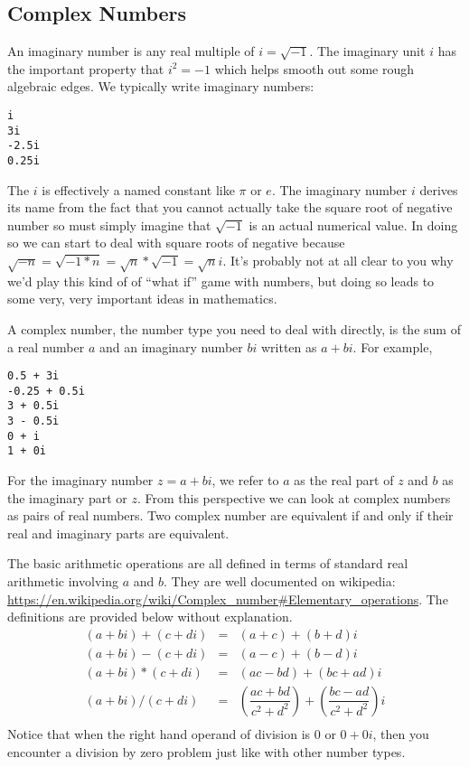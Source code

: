 \documentclass[10pt]{article}
\begin{document}
\subsection{Complex Numbers}

An imaginary number is any real multiple of $i = \sqrt{-1}$. The imaginary unit $i$ has the important property that $i^2 = -1$ which helps smooth out some rough algebraic edges. We typically write imaginary numbers: 
\begin{verbatim}
i
3i
-2.5i
0.25i
\end{verbatim}
The $i$ is effectively a named constant like $\pi$ or $e$. The imaginary number $i$ derives its name from the fact that you cannot actually take the square root of negative number so must simply imagine that $\sqrt{-1}$ is an actual numerical value. In doing so we can start to deal with square roots of negative because $\sqrt{-n} = \sqrt{-1*n} = \sqrt{n}*\sqrt{-1} = \sqrt{n}i$. It's probably not at all clear to you why we'd play this kind of of ``what if'' game with numbers, but doing so leads to some very, very important ideas in mathematics. 

A complex number, the number type you need to deal with directly, is the sum of a real number $a$ and an imaginary number $bi$ written as $a + bi$. For example,
\begin{verbatim}
0.5 + 3i
-0.25 + 0.5i
3 + 0.5i
3 - 0.5i
0 + i
1 + 0i
\end{verbatim}
For the imaginary number $z=a+bi$, we refer to $a$ as the real part of $z$ and $b$ as the imaginary part or $z$. From this perspective we can look at complex numbers as pairs of real numbers. Two complex number are equivalent if and only if their real and imaginary parts are equivalent.

The basic arithmetic operations are all defined in terms of standard real arithmetic involving $a$ and $b$. They are well documented on wikipedia: \url{https://en.wikipedia.org/wiki/Complex_number#Elementary_operations}. The definitions are provided below without explanation.
\begin{equation}
\begin{array}{rcl}
(a+bi)+(c+di) &=& (a+c)+(b+d)i \\ 
(a+bi)-(c+di) &=& (a-c)+(b-d)i \\
(a+bi)*(c+di) &=& (ac-bd)+(bc+ad)i \\
(a+bi)/(c+di) &=& \left(\dfrac{ac+bd}{c^2+d^2}\right)+\left(\dfrac{bc-ad}{c^2+d^2}\right)i \\
\end{array}
\end{equation}
Notice that when the right hand operand of division is $0$ or $0+0i$, then you encounter a division by zero problem just like with other number types.
\end{document}
